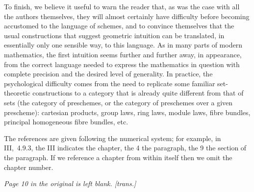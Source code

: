 \documentclass[../main.tex]{subfiles}
\begin{document}
\asttri

To finish, we believe it useful to warn the reader that, as was the case with all the authors themselves, they will almost certainly have difficulty before becoming accustomed to the language of schemes, and to convince themselves that the usual constructions that suggest geometric intuition can be translated, in essentially only one sensible way, to this language.
As in many parts of modern mathematics, the first intuition seems further and further away, in appearance, from the correct language needed to express the mathematics in question with complete precision and the desired level of generality.
In practice, the psychological difficulty comes from the need to replicate some familiar set-theoretic constructions to a category that is already quite different from that of sets (the category of preschemes, or the category of preschemes over a given prescheme): cartesian products, group laws, ring laws, module laws, fibre bundles, principal homogeneous fibre bundles, etc.

\asttri

The references are given following the numerical system; for example, in III,~4.9.3, the III indicates the chapter, the 4 the paragraph, the 9 the section of the paragraph.
If we reference a chapter from within itself then we omit the chapter number.

\bigskip

\emph{Page 10 in the original is left blank. [trans.]}
\end{document}
